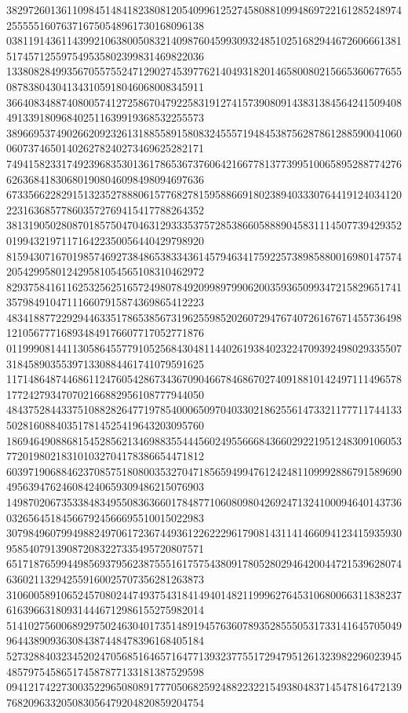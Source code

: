 \begin{DoxyCode}
      382972601361109845148418238081205409961252745808810994869722161285248974255555160763716750548961730168096138
      038119143611439921063800508321409876045993093248510251682944672606661381517457125597549535802399831469822036
      133808284993567055755247129027453977621404931820146580080215665360677655087838043041343105918046068008345911
      366408348874080057412725867047922583191274157390809143831384564241509408491339180968402511639919368532255573
      389669537490266209232613188558915808324555719484538756287861288590041060060737465014026278240273469625282171
      749415823317492396835301361786536737606421667781377399510065895288774276626368418306801908046098498094697636
      673356622829151323527888061577682781595886691802389403330764419124034120223163685778603572769415417788264352
      381319050280870185750470463129333537572853866058889045831114507739429352019943219711716422350056440429798920
      815943071670198574692738486538334361457946341759225738985880016980147574205429958012429581054565108310462972
      829375841611625325625165724980784920998979906200359365099347215829651741357984910471116607915874369865412223
      483418877229294463351786538567319625598520260729476740726167671455736498121056777168934849176607717052771876
      011999081441130586455779105256843048114402619384023224709392498029335507318458903553971330884461741079591625
      117148648744686112476054286734367090466784686702740918810142497111496578177242793470702166882956108777944050
      484375284433751088282647719785400065097040330218625561473321177711744133502816088403517814525419643203095760
      186946490886815452856213469883554445602495566684366029221951248309106053772019802183101032704178386654471812
      603971906884623708575180800353270471856594994761242481109992886791589690495639476246084240659309486215076903
      149870206735338483495508363660178487710608098042692471324100094640143736032656451845667924566695510015022983
      307984960799498824970617236744936122622296179081431141466094123415935930958540791390872083227335495720807571
      651718765994498569379562387555161757543809178052802946420044721539628074636021132942559160025707356281263873
      310600589106524570802447493754318414940148211999627645310680066311838237616396631809314446712986155275982014
      514102756006892975024630401735148919457636078935285550531733141645705049964438909363084387448478396168405184
      527328840323452024705685164657164771393237755172947951261323982296023945485797545865174587877133181387529598
      094121742273003522965080891777050682592488223221549380483714547816472139768209633205083056479204820859204754

\end{DoxyCode}
